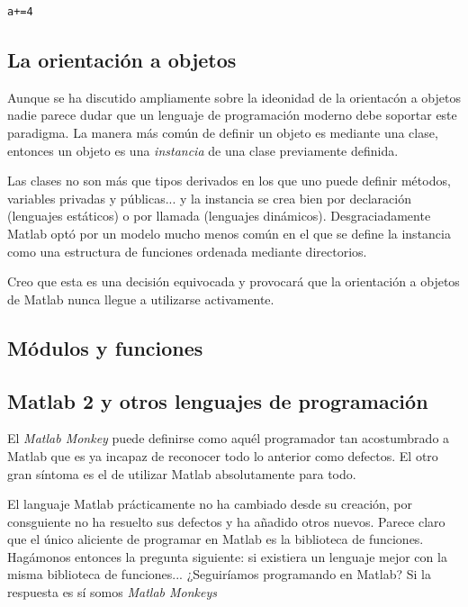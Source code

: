 \begin{verbatim}
a+=4
\end{verbatim}


\subsection{La orientación a objetos}

Aunque se ha discutido ampliamente sobre la ideonidad de la orientacón
a objetos nadie parece dudar que un lenguaje de programación moderno
debe soportar este paradigma. La manera más común de definir un objeto
es mediante una clase, entonces un objeto es una \emph{instancia} de
una clase previamente definida.

Las clases no son más que tipos derivados en los que uno puede definir
métodos, variables privadas y públicas... y la instancia se crea bien
por declaración (lenguajes estáticos) o por llamada (lenguajes
dinámicos).  Desgraciadamente Matlab optó por un modelo mucho menos
común en el que se define la instancia como una estructura de
funciones ordenada mediante directorios.

Creo que esta es una decisión equivocada y provocará que la
orientación a objetos de Matlab nunca llegue a utilizarse activamente.

\subsection{Módulos y funciones}

\subsection{Matlab 2 y otros lenguajes de programación}

El \emph{Matlab Monkey} puede definirse como aquél programador tan
acostumbrado a Matlab que es ya incapaz de reconocer todo lo anterior
como defectos.  El otro gran síntoma es el de utilizar Matlab
absolutamente para todo.

El languaje Matlab prácticamente no ha cambiado desde su creación, por
consguiente no ha resuelto sus defectos y ha añadido otros
nuevos. Parece claro que el único aliciente de programar en Matlab es
la biblioteca de funciones.  Hagámonos entonces la pregunta siguiente:
si existiera un lenguaje mejor con la misma biblioteca de
funciones... ¿Seguiríamos programando en Matlab?  Si la respuesta es
sí somos \emph{Matlab Monkeys}
